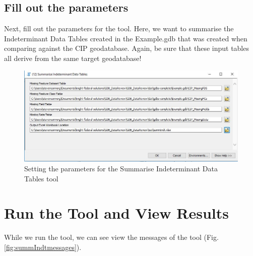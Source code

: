 \documentclass[openany]{book}
\theoremstyle{definition}
\theoremstyle{definition}
\theoremstyle{definition}
\theoremstyle{remark}
\begin{document}
\subsection{Fill out the parameters}\label{fill-out-the-parameters-8}

Next, fill out the parameters for the tool. Here, we want to summarise
the Indeterminant Data Tables created in the Example.gdb that was
created when comparing against the CIP geodatabase. Again, be sure that
these input tables all derive from the same target geodatabase!

\begin{figure}[H]

{\centering \includegraphics{figures/summIndt-toolparams} 

}

\caption{Setting the parameters for the Summarise Indeterminant Data Tables tool }\label{fig:summIndtparams}
\end{figure}

\section{Run the Tool and View
Results}\label{run-the-tool-and-view-results-8}

While we run the tool, we can see view the messages of the tool (Fig.
\ref{fig:summIndtmessages}).
\end{document}
